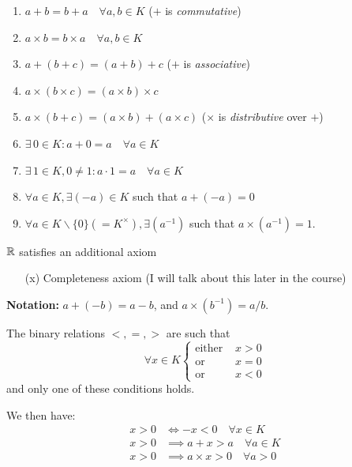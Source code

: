 \documentclass[10pt]{scrartcl}
\begin{document}
\begin{axiom}[Axioms of $K = \Q, K = \R$]
\begin{enumerate}
\item $a + b = b + a \quad \forall a,b \in K$ ($+$ is \emph{commutative})
\item $a \times b = b \times a \quad \forall a,b \in K$	
\item $a + (b+c) = (a+b) + c$ ($+$ is \emph{associative})
\item $a \times (b \times c) = (a\times b)\times c$
\item $a \times (b + c) = (a\times b ) + (a\times c)$ ($\times$ is \emph{distributive} over $+$)
\item $\exists\, 0 \in K: a + 0 = a \quad \forall a \in K$
\item $\exists\, 1 \in K, 0 \neq 1: a \cdot 1 = a \quad \forall a \in K$
\item $\forall a \in K, \exists (-a) \in K$ such that $a + (-a) = 0$
\item $\forall a \in K \backslash\{0\} (= K^{\times}), \exists (a^{-1})$ such that $a \times (a^{-1}) = 1$. 	
\end{enumerate}\vspace*{5pt}

$\mathbb{R}$ satisfies an additional axiom
\begin{enumerate}
\item[(x)] Completeness axiom (I will talk about this later in the course)	
\end{enumerate}
\end{axiom}\vspace*{5pt}


\textbf{Notation:}  $a + (-b) = a-b$, and $a \times (b^{-1}) = a/b$.\\

\begin{axiom}
The binary relations $<, =, >$ are such that 
\[\forall x \in K \begin{cases}
 \text{either } &x > 0 \\
 \text{or } &x = 0\\
 \text{or } &x < 0	
 \end{cases}
\]	
and only one of these conditions holds.
\end{axiom}
We then have: 
\[
\begin{aligned}
  x > 0 &\iff -x < 0\quad \forall x \in K\\
  x > 0 &\implies a + x > a \quad \forall a \in K\\
  x > 0 &\implies a \times x > 0 \quad \forall a > 0
\end{aligned}
\]
\end{document}
